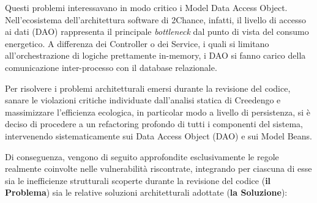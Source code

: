 Questi problemi interessavano in modo critico i Model Data Access Object. Nell'ecosistema dell'architettura software di 2Chance, infatti, il livello di accesso ai dati (DAO) rappresenta il principale \textit{bottleneck} dal punto di vista del consumo energetico. A differenza dei Controller o dei Service, i quali si limitano all'orchestrazione di logiche prettamente in-memory, i DAO si fanno carico della comunicazione inter-processo con il database relazionale.

Per risolvere i problemi architetturali emersi durante la revisione del codice, sanare le violazioni critiche individuate dall'analisi statica di Creedengo e massimizzare l'efficienza ecologica, in particolar modo a livello di persistenza, si è deciso di procedere a un refactoring profondo di tutti i componenti del sistema, intervenendo sistematicamente sui Data Access Object (DAO) e sui Model Beans.

Di conseguenza, vengono di seguito approfondite esclusivamente le regole realmente coinvolte nelle vulnerabilità riscontrate, integrando per ciascuna di esse sia le inefficienze strutturali scoperte durante la revisione del codice (\textbf{il Problema}) sia le relative soluzioni architetturali adottate (\textbf{la Soluzione}):


